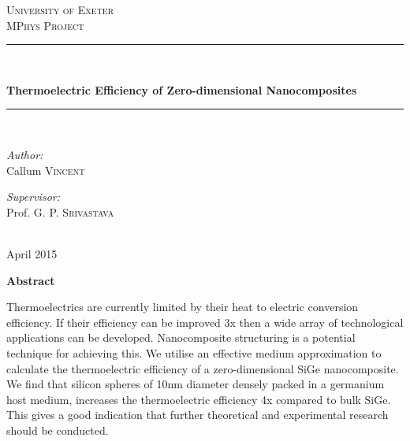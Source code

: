 \documentclass[12pt]{article}
\newcommand{\tms}{\textsf{x} }
\begin{document}

\pagestyle{empty}

\begin{titlepage}
\center
\textsc{\huge University of Exeter}\\[1cm]
\textsc{\Large MPhys Project}\\[1.5cm]

\rule{\linewidth}{0.5mm}\\[0.4cm]
\begin{doublespace}
{\LARGE \textbf{Thermoelectric Efficiency of Zero-dimensional Nanocomposites}}\\[0cm]
\end{doublespace}
\rule{\linewidth}{0.5mm}\\[2.5cm]
 
\begin{minipage}{0.4\textwidth}
\begin{flushleft} \large
\emph{Author:}\\
Callum \textsc{Vincent}
\end{flushleft}
\end{minipage}

\begin{minipage}{0.4\textwidth}
\begin{flushright} \large
\emph{Supervisor:} \\
Prof. G. P. \textsc{Srivastava}
\end{flushright}
\end{minipage}\\[4cm]

{\large April 2015}

\pagedecorationleft
\pagedecorationright
\end{titlepage}

\begin{center}
{\Huge\textbf{Abstract}}\\[2cm]
\end{center}
\begin{justify}
Thermoelectrics are currently limited by their heat to electric conversion efficiency. If their efficiency can be improved 3\tms then a wide array of technological applications can be developed. Nanocomposite structuring is a potential technique for achieving this. We utilise an effective medium approximation to calculate the thermoelectric efficiency of a zero-dimensional SiGe nanocomposite. We find that silicon spheres of 10nm diameter densely packed in a germanium host medium, increases the thermoelectric efficiency 4\tms compared to bulk SiGe. This gives a good indication that further theoretical and experimental research should be conducted.
\end{justify}
\end{document}
